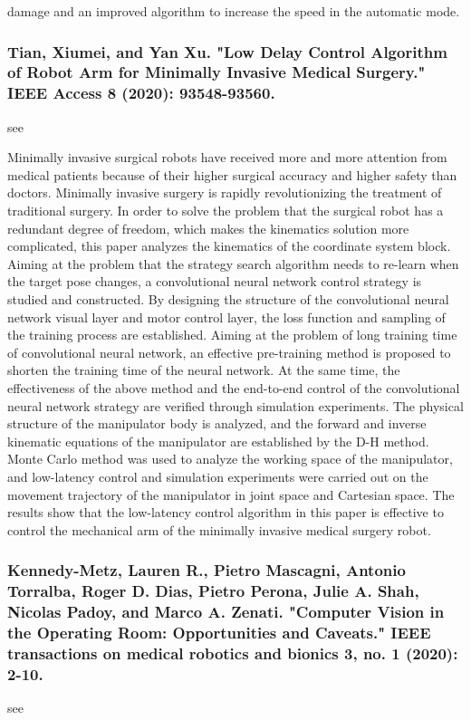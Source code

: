 \documentclass[conference]{IEEEtran}
\begin{document}
damage and an improved algorithm to increase the speed in the automatic mode.

\medskip
\subsubsection{Tian, Xiumei, and Yan Xu. "Low Delay Control Algorithm of Robot Arm for Minimally Invasive Medical Surgery." IEEE Access 8 (2020): 93548-93560.}
see \cite{tian2020low}

Minimally invasive surgical robots have received more and more attention from medical patients because of their higher surgical accuracy and higher safety than doctors. Minimally invasive surgery is rapidly revolutionizing the treatment of traditional surgery. In order to solve the problem that the surgical robot has a redundant degree of freedom, which makes the kinematics solution more complicated, this paper analyzes the kinematics of the coordinate system block. Aiming at the problem that the strategy search algorithm needs to re-learn when the target pose changes, a convolutional neural network control strategy is studied and constructed. By designing the structure of the convolutional neural network visual layer and motor control layer, the loss function and sampling of the training process are established. Aiming at the problem of long training time of convolutional neural network, an effective pre-training method is proposed to shorten the training time of the neural network. At the same time, the effectiveness of the above method and the end-to-end control of the convolutional neural network strategy are verified through simulation experiments. The physical structure of the manipulator body is analyzed, and the forward and inverse kinematic equations of the manipulator are established by the D-H method. Monte Carlo method was used to analyze the working space of the manipulator, and low-latency control and simulation experiments were carried out on the movement trajectory of the manipulator in joint space and Cartesian space. The results show that the low-latency control algorithm in this paper is effective to control the mechanical arm of the minimally invasive medical surgery robot.

\medskip
\subsubsection{Kennedy-Metz, Lauren R., Pietro Mascagni, Antonio Torralba, Roger D. Dias, Pietro Perona, Julie A. Shah, Nicolas Padoy, and Marco A. Zenati. "Computer Vision in the Operating Room: Opportunities and Caveats." IEEE transactions on medical robotics and bionics 3, no. 1 (2020): 2-10.}
see \cite{kennedy2020computer}
\end{document}
